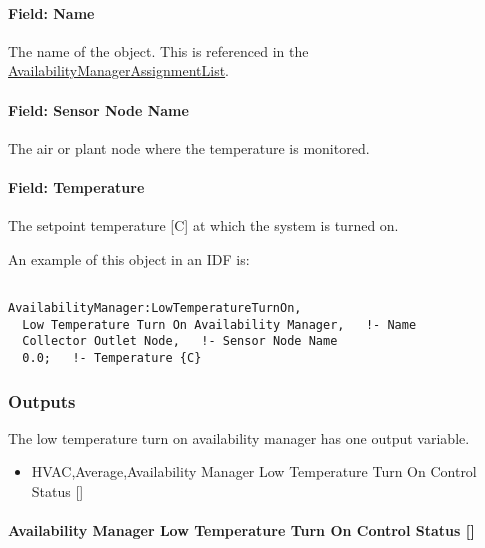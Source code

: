 \paragraph{Field: Name}\label{field-name-7-021}

The name of the object. This is referenced in the \hyperref[availabilitymanagerassignmentlist]{AvailabilityManagerAssignmentList}.

\paragraph{Field: Sensor Node Name}\label{field-sensor-node-name-3}

The air or plant node where the temperature is monitored.

\paragraph{Field: Temperature}\label{field-temperature-3}

The setpoint temperature {[}C{]} at which the system is turned on.

An example of this object in an IDF is:

\begin{lstlisting}

AvailabilityManager:LowTemperatureTurnOn,
  Low Temperature Turn On Availability Manager,   !- Name
  Collector Outlet Node,   !- Sensor Node Name
  0.0;   !- Temperature {C}
\end{lstlisting}

\subsubsection{Outputs}\label{outputs-7-010}

The low temperature turn on availability manager has one output variable.

\begin{itemize}
\tightlist
\item
  HVAC,Average,Availability Manager Low Temperature Turn On Control Status {[]}
\end{itemize}

\paragraph{Availability Manager Low Temperature Turn On Control Status {[]}}\label{availability-manager-low-temperature-turn-on-control-status}


